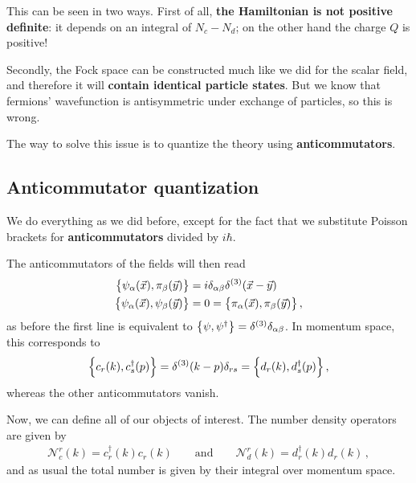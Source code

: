 \documentclass[main.tex]{subfiles}
\begin{document}
This can be seen in two ways. First of all, \textbf{the Hamiltonian is not positive definite}: it depends on an integral of \(N_c - N_d\); on the other hand the charge \(Q\) is positive!

Secondly, the Fock space can be constructed much like we did for the scalar field, and therefore it will \textbf{contain identical particle states}. But we know that fermions' wavefunction is antisymmetric under exchange of particles, so this is wrong. 

The way to solve this issue is to quantize the theory using \textbf{anticommutators}. 

\subsection{Anticommutator quantization}

We do everything as we did before, except for the fact that we substitute Poisson brackets for \textbf{anticommutators} divided by \(i \hbar\).

The anticommutators of the fields will then read 
%
\begin{subequations}
\begin{align}
\qty{\psi_{\alpha } (\vec{x}), \pi_{\beta } (\vec{y})} &= i \delta_{\alpha \beta } \delta^{(3)} (\vec{x}-\vec{y})  \\
\qty{\psi_{\alpha }(\vec{x}), \psi_{\beta }(\vec{y})} 
&= 0 = 
\qty{\pi_{\alpha }(\vec{x}), \pi_{\beta }(\vec{y})} 
\,,
\end{align}
\end{subequations}
%
as before the first line is equivalent to \(\qty{\psi, \psi ^\dag} = \delta^{(3)} \delta_{\alpha \beta }\).
In momentum space, this corresponds to 
%
\begin{align}
\qty{c_r (k), c_s ^\dag (p)} = \delta^{(3)} (k-p) \delta_{rs} = \qty{d_r (k), d_s ^\dag (p)}
\,,
\end{align}
%
whereas the other anticommutators vanish. 


Now, we can define all of our objects of interest. The number density operators are given by
%
\begin{align}
\mathscr{N}^{r}_{c} (k) = c ^\dag_{r} (k) c_r (k) \qquad \text{and} \qquad
\mathscr{N}^{r}_{d} (k) = d ^\dag_{r} (k) d_r (k)
\,,
\end{align}
%
and as usual the total number is given by their integral over momentum space. 
\end{document}
